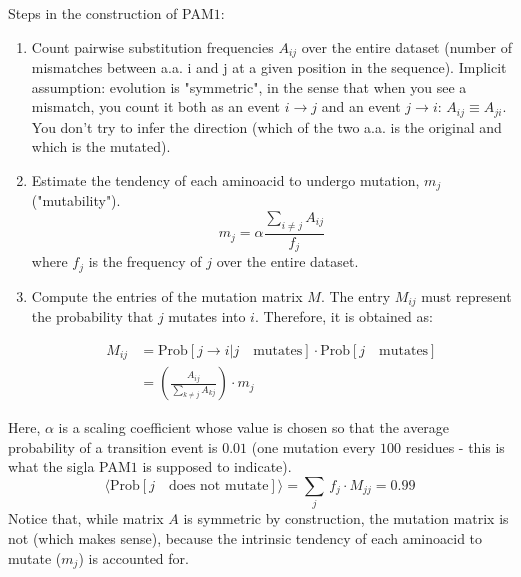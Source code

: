 Steps in the construction of PAM$1$:
\begin{enumerate}
    \item Count pairwise substitution frequencies $A_{ij}$ over the entire dataset (number of mismatches between a.a. i and j at a given position in the sequence). Implicit assumption: evolution is "symmetric",
    in the sense that when you see a mismatch, you count it both as an event $i\rightarrow j$ and an event $j\rightarrow i$: $A_{ij} \equiv A_{ji}$. You don't try to infer the direction (which of the two a.a. is the original and which is the mutated).
    \item Estimate the tendency of each aminoacid to undergo mutation, $m_j$ ("mutability"). 
    $$
    m_j = \alpha \frac{\sum_{i \neq j} A_{ij}}{f_j}
    $$
    where $f_j$ is the frequency of $j$ over the entire dataset.
    \item Compute the entries of the mutation matrix $M$. The entry $M_{ij}$ must represent the probability that $j$ mutates into $i$. Therefore, it is obtained as:

    \begin{align}
    M_{ij} &= \text{Prob}[j \rightarrow i | j\quad \text{mutates}] \cdot \text{Prob}[j \quad \text{mutates}] \\
        &=  \left(\frac{A_{ij}}{\sum_{k \neq j} A_{kj}} \right)\cdot m_j
    \end{align}
\end{enumerate}
Here, $\alpha$ is a scaling coefficient whose value is chosen so that the average probability of a transition event is $0.01$ (one mutation
    every $100$ residues - this is what the sigla PAM$1$ is supposed to indicate).
    $$
    \langle \text{Prob}[j \quad \text{does not mutate}] \rangle = \sum_j \, f_j \cdot  M_{jj}  = 0.99
    $$
Notice that, while matrix $A$ is symmetric by construction, the mutation matrix is not (which makes sense), because the intrinsic tendency of each aminoacid to mutate ($m_j$) is 
accounted for.

